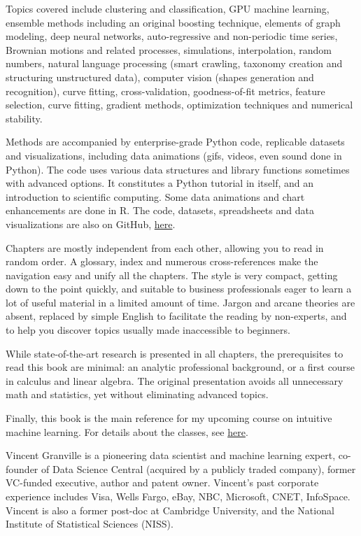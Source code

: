 \documentclass[oneside,10pt]{book}
\begin{document}
Topics covered include clustering and classification, GPU machine learning, ensemble methods including an original boosting technique, elements of graph modeling, deep neural networks, auto-regressive and non-periodic time series, Brownian motions and related processes, simulations, interpolation, random numbers, natural language processing (smart crawling, taxonomy creation and structuring unstructured data), computer vision (shapes generation and recognition), curve fitting, cross-validation, goodness-of-fit metrics, feature selection, curve fitting, gradient methods, optimization techniques and numerical stability. 

Methods are accompanied by enterprise-grade Python code, replicable datasets and  visualizations, including data animations (gifs, videos, even sound done in Python). The code
 uses various data structures and library functions sometimes with advanced options. It constitutes a Python tutorial in itself, and  an introduction to scientific computing. Some data animations and chart enhancements are done in R. The code, datasets, spreadsheets and data visualizations are also on GitHub, \href{https://github.com/VincentGranville/Machine-Learning}{here}.

Chapters are mostly independent from each other, allowing you to read in random order. A glossary, index and numerous cross-references make the navigation easy and unify all the chapters. The style is very compact, getting down to the point quickly, and suitable to business professionals eager to learn a lot of useful material in a limited amount of time. Jargon and arcane theories are absent, replaced by simple English to facilitate the reading by non-experts, and to help you discover topics usually made inaccessible to beginners. 

While state-of-the-art research is presented in all chapters, the prerequisites to read this book are minimal: an analytic professional background, or a first course in calculus and linear algebra. The original presentation avoids all unnecessary math and statistics, yet without eliminating advanced topics. 


Finally, this book is the main reference for my upcoming course on intuitive machine learning. For details about the classes, see \href{https://mltechniques.com/courses/}{here}. \vspace{1ex}

\vspace{1ex}

\noindent Vincent Granville is a pioneering data scientist and machine learning expert, co-founder of Data Science Central (acquired by a publicly traded company), former VC-funded executive, author and patent owner. Vincent’s past corporate experience includes Visa, Wells Fargo, eBay, NBC, Microsoft, CNET, InfoSpace. Vincent is also a former post-doc at Cambridge University, and the National Institute of Statistical Sciences (NISS).  
\end{document}
